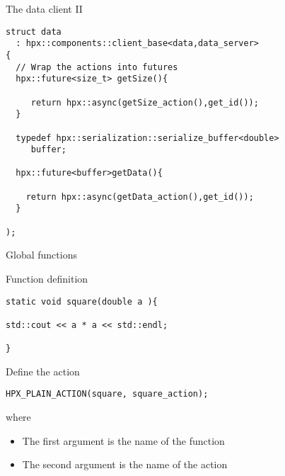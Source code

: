 \documentclass[\classoption]{beamer}
\begin{document}
\begin{frame}[fragile]{The data client II}

\begin{lstlisting}
struct data
  : hpx::components::client_base<data,data_server>
{
  // Wrap the actions into futures  
  hpx::future<size_t> getSize(){

     return hpx::async(getSize_action(),get_id());
  }
  
  typedef hpx::serialization::serialize_buffer<double> 
     buffer;
     
  hpx::future<buffer>getData(){

    return hpx::async(getData_action(),get_id());
  }
        
);
\end{lstlisting}

\end{frame}

\begin{frame}[fragile]{Global functions}

\begin{block}{Function definition}
\begin{lstlisting}
static void square(double a ){

std::cout << a * a << std::endl;

}
\end{lstlisting}
\end{block}

\begin{block}{Define the action}
\begin{lstlisting}
HPX_PLAIN_ACTION(square, square_action);
\end{lstlisting}
where
\begin{itemize}
\item The first argument is the name of the function
\item The second argument is the name of the action
\end{itemize}

\end{block}
\end{frame}
\end{document}

